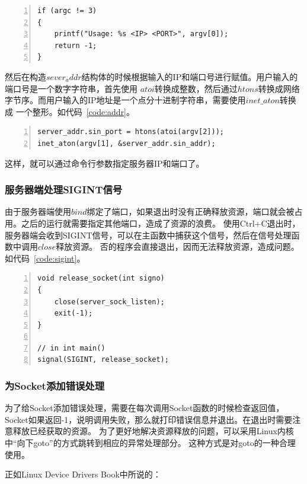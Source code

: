 \documentclass[a4paper,twoside]{article}
\begin{document}
\begin{spacing}{1.2}
\begin{lstlisting}[numbers=left,style=CppStyle,caption=检查$argc$,label={code:argc}]
if (argc != 3)
{
	printf("Usage: %s <IP> <PORT>", argv[0]);
	return -1;
}
\end{lstlisting}

然后在构造$sever_addr$结构体的时候根据输入的IP和端口号进行赋值。用户输入的端口号是一个数字字符串，首先使用
$atoi$转换成整数，然后通过$htons$转换成网络字节序。而用户输入的IP地址是一个点分十进制字符串，需要使用$inet\_aton$转换成
一个整形。如代码~\ref{code:addr}。

\begin{lstlisting}[numbers=left,style=CppStyle,caption=构造$sever_addr$结构体,label={code:addr}]
server_addr.sin_port = htons(atoi(argv[2]));
inet_aton(argv[1], &server_addr.sin_addr);
\end{lstlisting}

这样，就可以通过命令行参数指定服务器IP和端口了。

\subsubsection{服务器端处理SIGINT信号}

由于服务器端使用$bind$绑定了端口，如果退出时没有正确释放资源，端口就会被占用。之后的运行就需要指定其他端口，造成了资源的浪费。
使用Ctrl+C退出时，服务器端会收到SIGINT信号，可以在主函数中捕获这个信号，然后在信号处理函数中调用$close$释放资源。
否的程序会直接退出，因而无法释放资源，造成问题。如代码~\ref{code:sigint}。

\begin{lstlisting}[numbers=left,style=CppStyle,caption=捕获SIGINT信号,label={code:sigint}]
void release_socket(int signo)
{
	close(server_sock_listen);
	exit(-1);
}

// in int main()
signal(SIGINT, release_socket);
\end{lstlisting}

\subsubsection{为Socket添加错误处理}

为了给Socket添加错误处理，需要在每次调用Socket函数的时候检查返回值，
Socket如果返回-1，说明调用失败，那么就打印错误信息并退出。在退出时需要注意释放已经获取的资源。
为了更好地解决资源释放的问题，可以采用Linux内核中“向下goto”的方式跳转到相应的异常处理部分。
这种方式是对goto的一种合理使用。

正如Linux Device Drivers Book中\cite{corbet2005linux}所说的：


\end{spacing}
\end{document}
